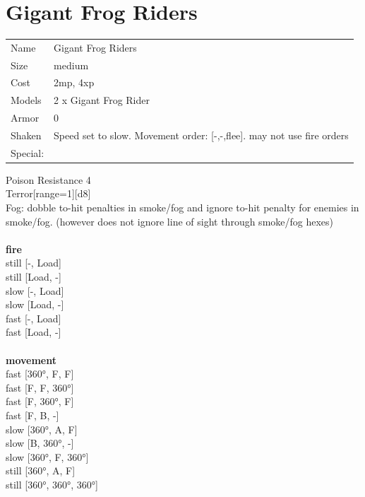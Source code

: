 \ \\

\ \\
 
\ \\













\clearpage

\section{ Gigant Frog Riders }

\begin{tabular}{ll}
  Name & Gigant Frog Riders \\
  Size & medium\\
  Cost & 2mp, 4xp\\
  Models & 2 x Gigant Frog Rider\\
  Armor & 0\\
  Shaken & Speed set to slow. Movement order: [-,-,flee]. may not use fire orders\\
  Special: \\
\end{tabular}

\noindent Poison Resistance 4\\ 
Terror[range=1][d8]\\ 
Fog: dobble to-hit penalties in smoke/fog and ignore to-hit penalty for enemies in smoke/fog. (however does not ignore line of sight through smoke/fog hexes)\\ 


\ \\ {\bf fire } \\
still [-, Load] \\
still [Load, -] \\
slow [-, Load] \\
slow [Load, -] \\
fast [-, Load] \\
fast [Load, -] \\
\ \\ {\bf movement } \\
fast [360°, F, F] \\
fast [F, F, 360°] \\
fast [F, 360°, F] \\
fast [F, B, -] \\
slow [360°, A, F] \\
slow [B, 360°, -] \\
slow [360°, F, 360°] \\
still [360°, A, F] \\
still [360°, 360°, 360°] \\


